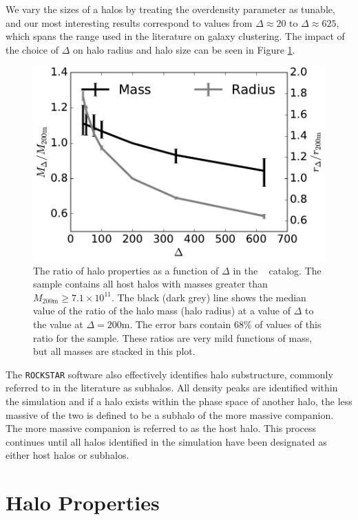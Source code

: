 \documentclass[usenatbib,fleqn]{mnras}
\begin{document}
We vary the sizes of a halos by treating the overdensity parameter as tunable, and our most interesting results correspond to values from $\Delta \approx 20$ to $\Delta \approx 625$, which spans the range used in the literature on galaxy clustering. 
The impact of the choice of $\Delta$ on halo radius and halo size can be seen in Figure \ref{fig:deltacompare}.

\begin{figure}
\centering
\includegraphics[width=\columnwidth]{massvsdelta_l0250.pdf}
\caption{
The ratio of halo properties as a function of $\Delta$ in the \simB~ catalog. The sample contains all host halos with masses greater than $M_{200\mathrm{m}} \ge 7.1 \times 10^{11}$. The black (dark grey) line shows the median value of the ratio of the halo mass (halo radius) at a value of $\Delta$ to the value at $\Delta=200\mathrm{m}$. The error bars contain 68\% of values of this ratio for the sample. These ratios are 
very mild functions of mass, but all masses are stacked in this plot.}
\label{fig:deltacompare}
\end{figure}

The {\tt ROCKSTAR} software also effectively identifies halo substructure, commonly referred to in the literature as subhalos. All density peaks are identified within the simulation and if a halo exists within the phase space of another halo, the less massive of the two is defined to be a subhalo of the more massive companion. The more massive companion is referred to as the host halo. This process continues until all halos identified in the simulation have been designated as either host halos or subhalos.

\section{Halo Properties}
\label{section:haloprops}
\end{document}
